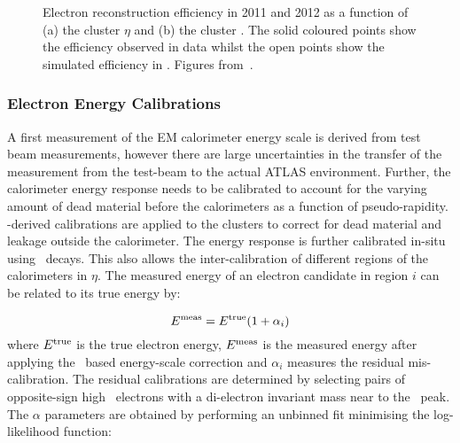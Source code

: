 \begin{figure}[h]
\centering
\caption[Electron reconstruction efficiency in 2011 and 2012 as a function of the cluster
$\eta$ and the cluster \et. ]{Electron reconstruction efficiency in 2011 and 2012 as a function of (a) the cluster
$\eta$ and (b) the cluster \et. The solid coloured points show the efficiency
observed in data whilst the open points show the simulated efficiency in
\mc. Figures from~\cite{ElectronEfficiency2012}.}
\label{fig:el-reco-eff}
\end{figure}

\subsubsection{Electron Energy Calibrations}
\label{el-energy-calibration}

A first measurement of the EM calorimeter energy scale is derived from test beam
measurements, however there are large uncertainties in the transfer of the
measurement from the test-beam to the actual ATLAS environment. Further, the
calorimeter energy response needs to be calibrated to account for the varying
amount of dead material before the calorimeters as a function of
pseudo-rapidity. \mc-derived calibrations are applied to the clusters to correct
for dead material and leakage outside the calorimeter. The energy response is
further calibrated in-situ using \Zee\ decays. This also allows the
inter-calibration of different regions of the calorimeters in $\eta$. The
measured energy of an electron candidate in region $i$ can be related to its
true energy by:

\begin{equation}
E^{\rm meas} = E^{\rm true}(1 + \alpha_{i})
\end{equation}
where $E^{\rm true}$ is the true electron energy, $E^{\rm meas}$ is the measured
energy after applying the \mc\ based energy-scale correction and $\alpha_{i}$
measures the residual mis-calibration. The residual calibrations are determined
by selecting pairs of opposite-sign high \pt\ electrons with a di-electron
invariant mass near to the \Z\ peak. The $\alpha$ parameters are obtained by
performing an unbinned fit minimising the log-likelihood function:

